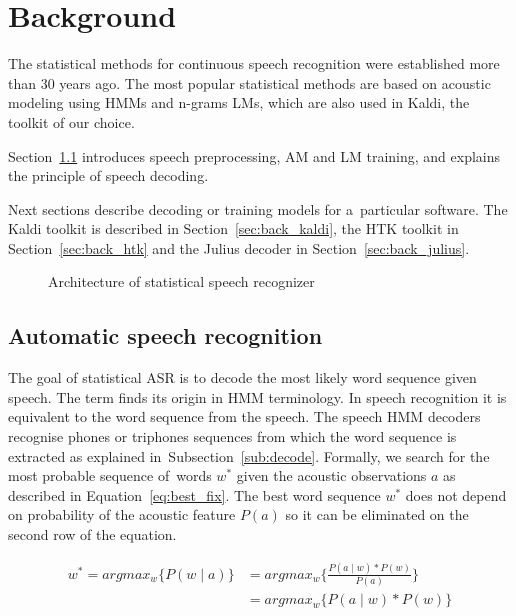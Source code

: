 \chapter{Background}
\label{cha:background}

The statistical methods for continuous speech recognition were established more than 30 years ago. 
The most popular statistical methods are based on acoustic modeling using \acp{HMM} and n-grams \acp{LM}, which are also used in Kaldi, the toolkit of our choice.

Section~\ref{sec:back_asr} introduces speech preprocessing, \acf{AM} and \acf{LM} training, and explains the principle of speech decoding.

Next sections describe decoding or training models for a~particular software.
The Kaldi toolkit is described in Section~\ref{sec:back_kaldi}, the \ac{HTK} toolkit in Section~\ref{sec:back_htk} and the Julius decoder in Section~\ref{sec:back_julius}.

\begin{figure}[!htp]
    \begin{center}
    
    \caption{Architecture of statistical speech recognizer\cite{ney1990acoustic}}
    \label{fig:components} 
    \end{center}
\end{figure}

\section{Automatic speech recognition}
\label{sec:back_asr}

The goal of statistical \ac{ASR} is to decode the most likely word sequence given speech.
The term  finds its origin in \acs{HMM} terminology. 
In speech recognition it is equivalent to  the word sequence from the speech. 
The speech \ac{HMM} decoders recognise phones or triphones sequences from which the word sequence is extracted as explained in~Subsection~\ref{sub:decode}.
Formally, we search for the most probable sequence of~words $w^*$ given the acoustic observations $a$ as described in Equation~\ref{eq:best_fix}.
The best word sequence $w^*$ does not depend on probability of the acoustic feature $P(a)$ so it can be eliminated on the second row of the equation.

\begin{equation}\label{eq:best_fix}
    \begin{split}
    w^* = argmax_{w}\{P(w \mid a)\} &= argmax_{w}\{\frac{P(a \mid w) * P(w)}{P(a)}\} \\
                                    &= argmax_{w}\{P(a \mid w) * P(w)\}
    \end{split}
\end{equation}

